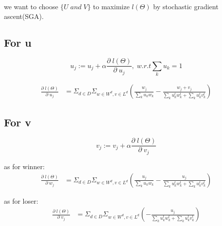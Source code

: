 \documentclass{article}
\begin{document}
 we want to choose $\{ U \; and \; V\}$ to maximize $ l(\Theta) $ by stochastic gradient ascent(SGA).


\subsection{For u}
$$u_j:= u_j + \alpha \frac{\partial \;l(\Theta) }{\partial \;u_j},\; w.r.t\sum_k u_k=1 $$

\begin{align}
\frac{\partial \;l(\Theta) }{\partial \;u_j}
 &= \Sigma_{d \in D} \Sigma_{w\in W^d, v\in L^d}(\frac{w_j}{\sum_k u_k w_k}-\frac{w_j+v_j}{\sum_k u_k^t w_k^t + \sum_k u_k^t v_k^t})
\end{align}

\subsection{For v}

$$v_j:= v_j + \alpha \frac{\partial \;l(\Theta) }{\partial \;v_j}$$

as for winner:
\begin{align}
\frac{\partial \;l(\Theta)}{\partial \;w_j}
&=  \Sigma_{d \in D} \Sigma_{w\in W^d, v\in L^d}(\frac{u_j}{\sum_k u_k w_k}-\frac{u_j}{\sum_k u_k^t w_k^t + \sum_k u_k^t v_k^t})
\end{align}

as for loser:
\begin{align}
\frac{\partial \;l(\Theta)}{\partial \;v_j}
&=  \Sigma_{d \in D} \Sigma_{w\in W^d, v\in L^d}(-\frac{u_j}{\sum_k u_k^t w_k^t + \sum_k u_k^t v_k^t})
\end{align}
\end{document}
